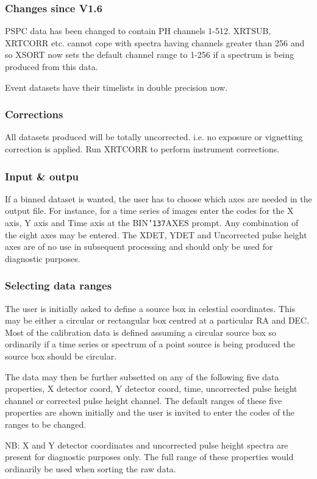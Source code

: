 \documentclass{book}
\renewcommand{\_}{{\tt\char'137}}     %
\begin{document}
\subsubsection{Changes since V1.6}
PSPC data has been changed to contain PH channels 1-512. XRTSUB, XRTCORR
etc. cannot cope with spectra having channels greater than 256 and so XSORT
now sets the default channel range to 1-256 if a spectrum is being produced
from this data.
 
Event datasets have their timelists in double precision now.
 
\subsubsection{Corrections}
All datasets produced will be totally uncorrected. i.e. no exposure
or vignetting correction is applied. Run XRTCORR to perform instrument
corrections.
 
\subsubsection{Input \& outpu}
If a binned dataset is wanted, the user has to choose which axes are
needed in the output file. For instance, for a time series of images
enter the codes for the X axis, Y axis and Time axis at the BIN\_AXES
prompt. Any combination of the eight axes may be entered. The XDET,
YDET and Uncorrected pulse height axes are of no use in subsequent
processing and should only be used for diagnostic purposes.
 
\subsubsection{Selecting data ranges}
The user is initially asked to define a source box in celestial
coordinates. This may be either a circular or rectangular box centred
at a particular RA and DEC. Most of the calibration data is defined
assuming a circular source box so ordinarily if a time series or
spectrum of a point source is being produced the source box
should be circular.
 
The data may then be further subsetted on any of the following five data
properties, X detector coord, Y detector coord, time, uncorrected
pulse height channel or corrected pulse height channel.
The default ranges of these five properties are shown initially
and the user is invited to enter the codes of the ranges to be changed.
 
NB: X and Y detector coordinates and uncorrected pulse height spectra
are present for diagnostic purposes only. The full range of these
properties would ordinarily be used when sorting the raw data.
 
\end{document}
